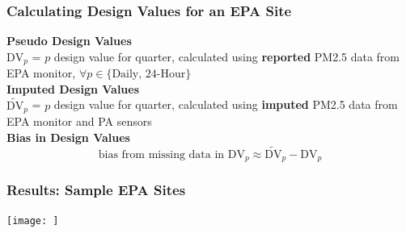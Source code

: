 \documentclass{beamer}
\begin{document}
\begin{frame}
\frametitle{Calculating Design Values for an EPA Site}

\def\dvp{\text{DV}_p}
\def\dvpp{\widetilde{\text{DV}}_p}

\textbf{Pseudo Design Values}\\[0.5em]
$\dvp$ = $p$ design value for quarter, calculated using \textbf{reported} PM2.5 data from EPA monitor, $\forall p \in \{\text{Daily, 24-Hour}\}$
\\[1em]

\textbf{Imputed Design Values}\\[0.5em]
$\dvpp$ = $p$ design value for quarter, calculated using \textbf{imputed} PM2.5 data from EPA monitor and PA sensors
\\[2em]
\textbf{Bias in Design Values}
\begin{equation*}
    \text{bias from missing data in }\dvp \approx \dvpp - \dvp
\end{equation*}

\end{frame}


\begin{frame}
\frametitle{Results: Sample EPA Sites}
\texttt{[image: ]}
\end{frame}
\end{document}
